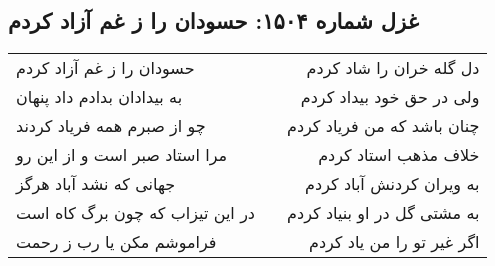 \begin{center}
\section*{غزل شماره ۱۵۰۴: حسودان را ز غم آزاد کردم}
\label{sec:1504}
\begin{longtable}{l p{0.5cm} r}
حسودان را ز غم آزاد کردم
&&
دل گله خران را شاد کردم
\\
به بیدادان بدادم داد پنهان
&&
ولی در حق خود بیداد کردم
\\
چو از صبرم همه فریاد کردند
&&
چنان باشد که من فریاد کردم
\\
مرا استاد صبر است و از این رو
&&
خلاف مذهب استاد کردم
\\
جهانی که نشد آباد هرگز
&&
به ویران کردنش آباد کردم
\\
در این تیزاب که چون برگ کاه است
&&
به مشتی گل در او بنیاد کردم
\\
فراموشم مکن یا رب ز رحمت
&&
اگر غیر تو را من یاد کردم
\\
\end{longtable}
\end{center}
